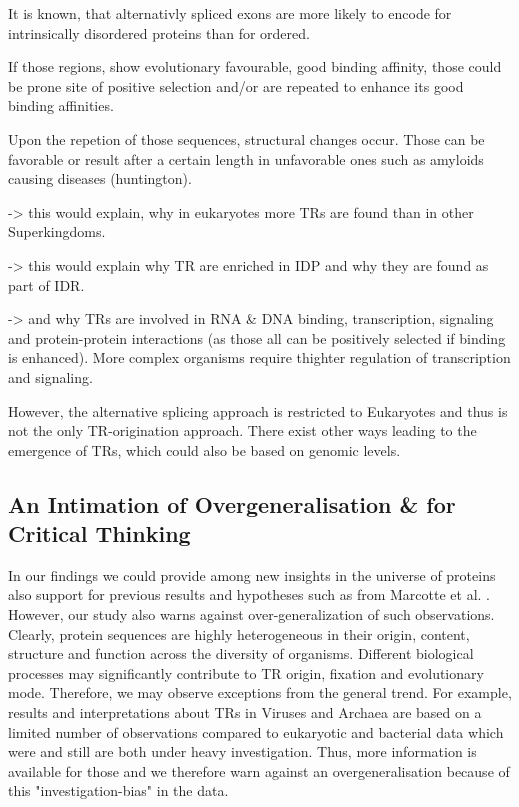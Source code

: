 \documentclass[a4,center,fleqn]{NAR}
\begin{document}
It is known, that alternativly spliced exons are more likely to encode for intrinsically disordered proteins than for ordered. 

If those regions, show evolutionary favourable, good binding affinity, those could be prone site of positive selection and/or are repeated to enhance its good binding affinities. 

Upon the repetion of those sequences, structural changes occur. Those can be favorable or result after a certain length in unfavorable ones such as amyloids causing diseases (huntington). 

-> this would explain, why in eukaryotes more TRs are found than in other Superkingdoms. 

-> this would explain why TR are enriched in IDP and why they are found as part of IDR.

-> and why TRs are involved in RNA \& DNA binding, transcription, signaling and protein-protein interactions (as those all can be positively selected if binding is enhanced). More complex organisms require thighter regulation of transcription and signaling.

However, the alternative splicing approach is restricted to Eukaryotes and thus is not the only TR-origination approach. There exist other ways leading to the emergence of TRs, which could also be based on genomic levels. 

\subsection{An Intimation of Overgeneralisation \& for Critical Thinking}
In our findings we could provide among new insights in the universe of proteins also support for previous results and hypotheses such as from Marcotte et al. \cite{Marcotte1999}.
However, our study also warns against over-generalization of such observations. Clearly, protein sequences are highly heterogeneous in their origin, content, structure and function across the diversity of organisms. Different biological processes may significantly contribute to TR origin, fixation and evolutionary mode. Therefore, we may observe exceptions from the general trend. For example, results and interpretations about TRs in Viruses and Archaea are based on a limited number of observations compared to eukaryotic and bacterial data which were and still are both under heavy investigation. Thus, more information is available for those and we therefore warn against an overgeneralisation because of this "investigation-bias" in the data.
\end{document}
